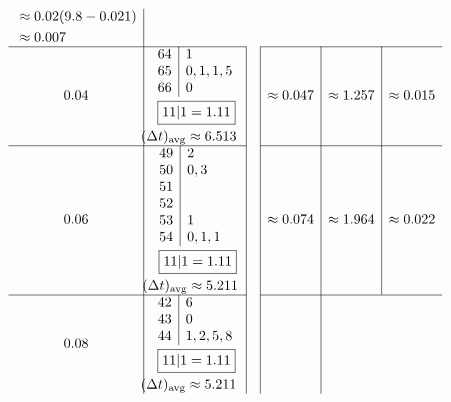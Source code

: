 \documentclass[12pt, A4]{article}
\newcommand{\avg}[1]{#1_{\mathrm{avg}}}
\begin{document}
\[\begin{array}{c|c|c|c|c|c}
\begin{aligned}
							&\approx 0.02(9.8 - 0.021) \\
							&\approx 0.007
					\end{aligned} \\\cline{1-2} \cline{4-6}
				0.04 &
					\begin{aligned}
						&\begin{array}{r|l}
							64 & 1 \\
							65 & 0, 1, 1, 5 \\
							66 & 0
						\end{array} \\
						&\hspace{1.7mm}\boxed{11|1 = 1.11} \\
						&\hspace{-2.45mm}\avg{(\Delta t)} \approx 6.513
					\end{aligned} &&
					\approx 0.047 &
					\approx 1.257 &
					\approx 0.015 \\\cline{1-2} \cline{4-6} 
				0.06 &
					\begin{aligned}
						&\begin{array}{r|l}
							49 & 2 \\
							50 & 0, 3 \\
							51 & \\
							52 & \\
							53 & 1 \\
							54 & 0, 1, 1
						\end{array} \\
						&\hspace{1.65mm}\boxed{11|1 = 1.11} \\
						&\hspace{-2.47mm}\avg{(\Delta t)} \approx 5.211
					\end{aligned} &&
					\approx 0.074 &
					\approx 1.964 &
					\approx 0.022 \\\cline{1-2} \cline{4-6}
				0.08 &
					\begin{aligned}
						&\begin{array}{r|l}
							42 & 6 \\
							43 & 0 \\
							44 & 1, 2, 5, 8
						\end{array} \\
						&\hspace{1.7mm}\boxed{11|1 = 1.11} \\
						&\hspace{-2.5mm}\avg{(\Delta t)} \approx 5.211
					\end{aligned} &&

\end{array}\]
\end{document}
